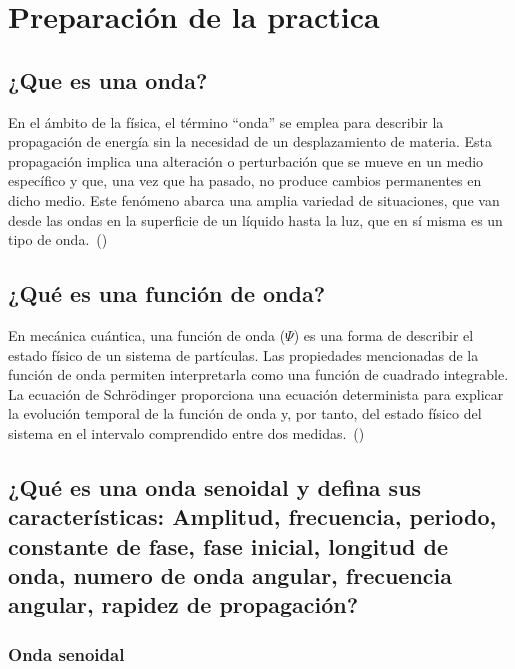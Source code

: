 \documentclass[twocolumn, 12pt]{article}
\begin{document}
\section{Preparación de la practica}

\subsection{¿Que es una onda?}

En el ámbito de la física, el término ``onda'' se emplea
para describir la propagación de energía sin la necesidad
de un desplazamiento de materia. Esta propagación implica
una alteración o perturbación que se mueve en un medio
específico y que, una vez que ha pasado, no produce cambios
permanentes en dicho medio. Este fenómeno abarca una amplia
variedad de situaciones, que van desde las ondas en la
superficie de un líquido hasta la luz, que en sí misma es
un tipo de onda.~(\cite{ondas-definicion})

\subsection{¿Qué es una función de onda?}

En mecánica cuántica, una función de onda ($\Psi$) es una
forma de describir el estado físico de un sistema de
partículas. Las propiedades mencionadas de la función de
onda permiten interpretarla como una función de cuadrado
integrable. La ecuación de Schrödinger proporciona una
ecuación determinista para explicar la evolución temporal
de la función de onda y, por tanto, del estado físico del
sistema en el intervalo comprendido entre dos
medidas.~(\cite{funcion-ondas})

\subsection{¿Qué es una onda senoidal y defina sus características: Amplitud, frecuencia, periodo, constante
    de fase, fase inicial, longitud de onda, numero de onda angular, frecuencia angular, rapidez de
    propagación?}

\subsubsection{Onda senoidal}
\end{document}
